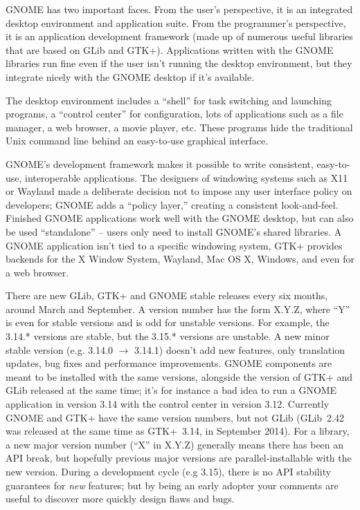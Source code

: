 GNOME has two important faces. From the user's perspective, it is an integrated desktop environment and application suite. From the programmer's perspective, it is an application development framework (made up of numerous useful libraries that are based on GLib and GTK+). Applications written with the GNOME libraries run fine even if the user isn't running the desktop environment, but they integrate nicely with the GNOME desktop if it's available.

The desktop environment includes a ``shell'' for task switching and launching programs, a ``control center'' for configuration, lots of applications such as a file manager, a web browser, a movie player, etc. These programs hide the traditional Unix command line behind an easy-to-use graphical interface.

GNOME's development framework makes it possible to write consistent, easy-to-use, interoperable applications. The designers of windowing systems such as X11 or Wayland made a deliberate decision not to impose any user interface policy on developers; GNOME adds a ``policy layer,'' creating a consistent look-and-feel. Finished GNOME applications work well with the GNOME desktop, but can also be used ``standalone'' -- users only need to install GNOME's shared libraries. A GNOME application isn't tied to a specific windowing system, GTK+ provides backends for the X Window System, Wayland, Mac OS X, Windows, and even for a web browser.

There are new GLib, GTK+ and GNOME stable releases every six months, around March and September. A version number has the form X.Y.Z, where ``Y'' is even for stable versions and is odd for unstable versions. For example, the 3.14.* versions are stable, but the 3.15.* versions are unstable. A new minor stable version (e.g. 3.14.0 $\rightarrow$ 3.14.1) doesn't add new features, only translation updates, bug fixes and performance improvements. GNOME components are meant to be installed with the same versions, alongside the version of GTK+ and GLib released at the same time; it's for instance a bad idea to run a GNOME application in version 3.14 with the control center in version 3.12. Currently GNOME and GTK+ have the same version numbers, but not GLib (GLib~2.42 was released at the same time as GTK+~3.14, in September 2014). For a library, a new major version number (``X'' in X.Y.Z) generally means there has been an API break, but hopefully previous major versions are parallel-installable with the new version. During a development cycle (e.g 3.15), there is no API stability guarantees for \emph{new} features; but by being an early adopter your comments are useful to discover more quickly design flaws and bugs.

